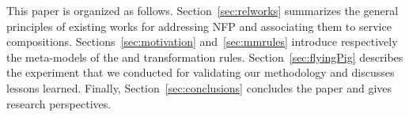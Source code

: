 This paper is organized as follows.
Section~\ref{sec:relworks} summarizes the general principles of existing works for addressing NFP and associating them to service compositions.
Sections~\ref{sec:motivation}  and~\ref{sec:mmrules} introduce respectively the meta-models of the \pisodm and transformation rules. 
Section~\ref{sec:flyingPig} describes the experiment that we conducted for validating our methodology and discusses lessons learned. 
Finally, Section~\ref{sec:conclusions} concludes the paper and gives research perspectives.





